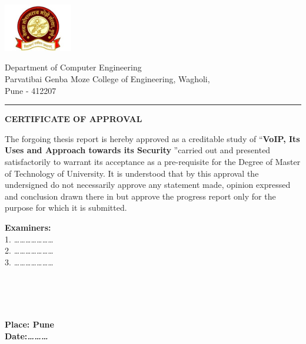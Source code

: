 \thispagestyle{plain}
\normalsize
\begin{multicols}{1}
 \flushleft
 \includegraphics[width=30mm]{Media/Logo/logo_utp.jpg}
 \columnbreak
 \par
 Department of Computer Engineering\\
 Parvatibai Genba Moze College of Engineering, Wagholi, \\
 Pune - 412207
\end{multicols}

\vspace{0.3\baselineskip}
\hrule
\vspace{1\baselineskip}

\begin{center}
{\Large {\bf \uppercase{Certificate of Approval}}}
\end{center}

\vspace{\baselineskip}
\justify
\noindent
The forgoing thesis report is hereby approved as a creditable study of \textquotedblleft {\bf VoIP, Its Uses and Approach
towards its Security} \textquotedblright carried out and presented satisfactorily to warrant its acceptance as a pre-requisite for the Degree of Master of Technology of University. It is understood that by this approval the undersigned do not necessarily approve any statement made, opinion expressed and conclusion drawn there in but approve the progress report only for the purpose for which it is submitted.
\justify

\vspace{15\baselineskip}

\begin{minipage}{0.45\textwidth}
\textbf{Examiners:}\\
1. \emph{…………………}\\
2. \emph{…………………}\\
3. \emph{…………………}\\[0.65cm]
\end{minipage}
~
\begin{minipage}{0.45\textwidth}
\begin{flushright} 
\\
\\
{\small \bf Place: Pune} \\
{\small \bf Date:\emph{………}}\\[0.65cm]
\end{flushright}
\end{minipage}
\newpage